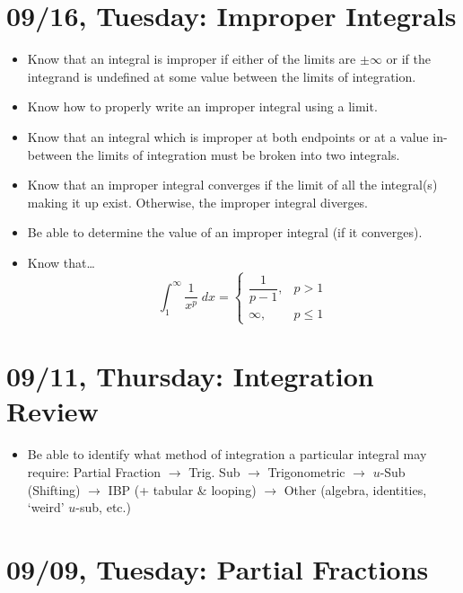 \documentclass[11pt,letterpaper]{article}
\begin{document}
\newpage
\section*{09/16, Tuesday: Improper Integrals\label{09-16}}

\begin{itemize}
\item Know that an integral is improper if either of the limits are $\pm\infty$ or if the integrand is undefined at some value between the limits of integration.
\item Know how to properly write an improper integral using a limit. 
\item Know that an integral which is improper at both endpoints or at a value in-between the limits of integration must be broken into two integrals. 
\item Know that an improper integral converges if the limit of all the integral(s) making it up exist. Otherwise, the improper integral diverges. 
\item Be able to determine the value of an improper integral (if it converges). 
\item Know that\dots
	\[
	\int_1^\infty \dfrac{1}{x^p} \;dx= \begin{cases} \dfrac{1}{p - 1}, & p > 1 \\ \infty, & p \leq 1 \end{cases}
	\]
\end{itemize}

\newpage
\section*{09/11, Thursday: Integration Review\label{09-11}}

\begin{itemize}
\item Be able to identify what method of integration a particular integral may require: Partial Fraction $\to$ Trig. Sub $\to$ Trigonometric $\to$ $u$-Sub (Shifting) $\to$ IBP (+ tabular \& looping) $\to$ Other (algebra, identities, `weird' $u$-sub, etc.)
\end{itemize}

\newpage
\section*{09/09, Tuesday: Partial Fractions\label{09-09}}
\end{document}
